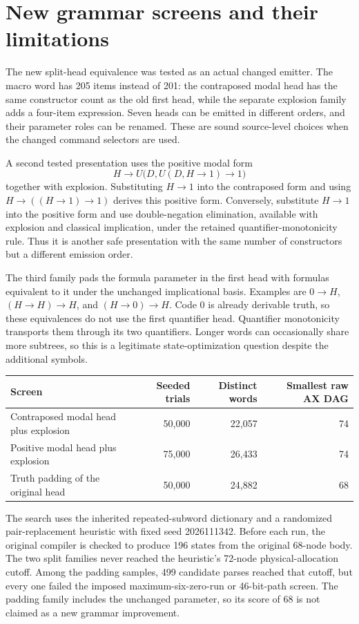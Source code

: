 \section{New grammar screens and their limitations}

The new split-head equivalence was tested as an actual changed emitter.
The macro word has 205 items instead of 201: the contraposed modal head
has the same constructor count as the old first head, while the separate
explosion family adds a four-item expression. Seven heads can be emitted
in different orders, and their parameter roles can be renamed. These are
sound source-level choices when the changed command selectors are used.

A second tested presentation uses the positive modal form
\[
 H\to U\bigl(D,U(D,H\to1)\to1\bigr)
\]
together with explosion. Substituting $H\to1$ into the contraposed form
and using $H\to((H\to1)\to1)$ derives this positive form. Conversely,
substitute $H\to1$ into the positive form and use double-negation
elimination, available with explosion and classical implication, under
the retained quantifier-monotonicity rule. Thus it is another safe
presentation with the same number of constructors but a different
emission order.

The third family pads the formula parameter in the first head with
formulas equivalent to it under the unchanged implicational basis.
Examples are $0\to H$, $(H\to H)\to H$, and $(H\to0)\to H$.
Code $0$ is already derivable truth, so these equivalences do not use
the first quantifier head. Quantifier monotonicity transports them
through its two quantifiers. Longer words can occasionally share more
subtrees, so this is a legitimate state-optimization question despite
the additional symbols.

\begin{center}\small
\begin{tabular}{@{}lrrr@{}}
\toprule
Screen & Seeded trials & Distinct words & Smallest raw AX DAG\\
\midrule
Contraposed modal head plus explosion &50,000&22,057&74\\
Positive modal head plus explosion &75,000&26,433&74\\
Truth padding of the original head &50,000&24,882&68\\
\bottomrule
\end{tabular}
\end{center}

The search uses the inherited repeated-subword dictionary and a randomized
pair-replacement heuristic with fixed seed 2026111342. Before each run,
the original compiler is checked to produce 196 states from the original
68-node body. The two split families never reached the heuristic's
72-node physical-allocation cutoff. Among the padding samples, 499
candidate parses reached that cutoff, but every one failed the imposed
maximum-six-zero-run or 46-bit-path screen. The padding family includes
the unchanged parameter, so its score of 68 is not claimed as a new
grammar improvement.

